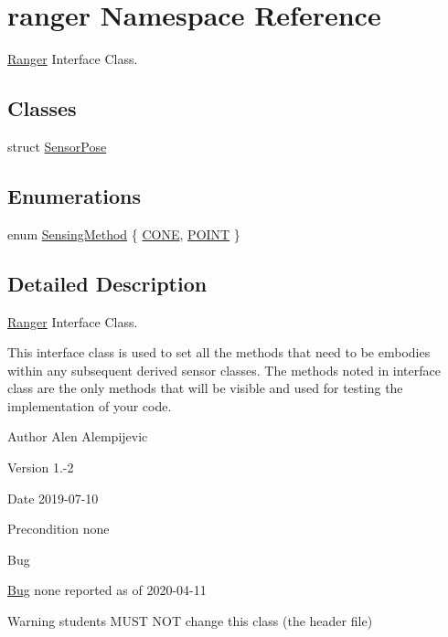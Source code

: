 \hypertarget{namespaceranger}{}\section{ranger Namespace Reference}
\label{namespaceranger}


\hyperlink{classRanger}{Ranger} Interface Class.  


\subsection*{Classes}
\begin{DoxyCompactItemize}
\item 
struct \hyperlink{structranger_1_1SensorPose}{Sensor\+Pose}
\end{DoxyCompactItemize}
\subsection*{Enumerations}
\begin{DoxyCompactItemize}
\item 
enum \hyperlink{namespaceranger_ab04465c229cc50595ffe40a891a3b135}{Sensing\+Method} \{ \hyperlink{namespaceranger_ab04465c229cc50595ffe40a891a3b135ace9fd8ac6cdd5af7d1ef291eb9fc41af}{C\+O\+NE}, 
\hyperlink{namespaceranger_ab04465c229cc50595ffe40a891a3b135a6cd3b981ee1a6dc6afc81a8052d366f3}{P\+O\+I\+NT}
 \}
\end{DoxyCompactItemize}


\subsection{Detailed Description}
\hyperlink{classRanger}{Ranger} Interface Class. 

This interface class is used to set all the methods that need to be embodies within any subsequent derived sensor classes. The methods noted in interface class are the only methods that will be visible and used for testing the implementation of your code. \begin{DoxyAuthor}{Author}
Alen Alempijevic 
\end{DoxyAuthor}
\begin{DoxyVersion}{Version}
1.-\/2 
\end{DoxyVersion}
\begin{DoxyDate}{Date}
2019-\/07-\/10 
\end{DoxyDate}
\begin{DoxyPrecond}{Precondition}
none 
\end{DoxyPrecond}
\begin{DoxyRefDesc}{Bug}
\item[\hyperlink{bug__bug000009}{Bug}]none reported as of 2020-\/04-\/11 \end{DoxyRefDesc}
\begin{DoxyWarning}{Warning}
students M\+U\+ST N\+OT change this class (the header file) 
\end{DoxyWarning}


